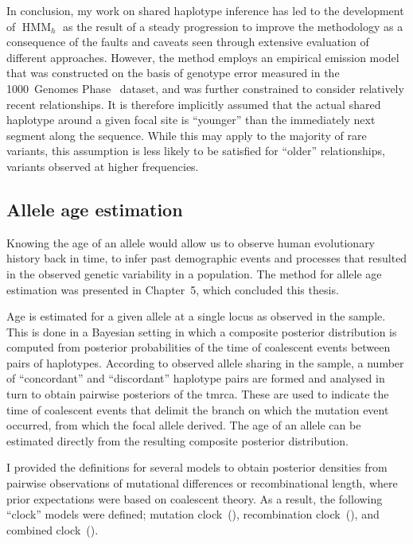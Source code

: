 In conclusion, my work on shared haplotype inference has led to the development of $\operatorname{HMM}_h$ as the result of a steady progression to improve the methodology as a consequence of the faults and caveats seen through extensive evaluation of different approaches.
However, the method employs an empirical emission model that was constructed on the basis of genotype error measured in the 1000~Genomes Phase~ dataset, and was further constrained to consider relatively recent relationships.
It is therefore implicitly assumed that the actual shared haplotype around a given focal site is ``younger'' than the immediately next segment along the sequence.
While this may apply to the majority of rare variants, this assumption is less likely to be satisfied for ``older'' relationships, \eg variants observed at higher frequencies.



\subsection{Allele age estimation}

Knowing the age of an allele would allow us to observe human evolutionary history back in time, to infer past demographic events and processes that resulted in the observed genetic variability in a population.
The method for allele age estimation was presented in Chapter~5, which concluded this thesis.

Age is estimated for a given allele at a single locus as observed in the sample.
This is done in a Bayesian setting in which a composite posterior distribution is computed from
posterior probabilities of the time of coalescent events between pairs of haplotypes.
According to observed allele sharing in the sample, a number of ``concordant'' and ``discordant'' haplotype pairs are formed and analysed in turn to obtain pairwise posteriors of the \gls{tmrca}.
These are used to indicate the time of coalescent events that delimit the branch on which the mutation event occurred, from which the focal allele derived.
The age of an allele can be estimated directly from the resulting composite posterior distribution.

I provided the definitions for several models to obtain posterior densities from pairwise observations of mutational differences or recombinational length, where prior expectations were based on coalescent theory.
As a result, the following ``clock'' models were defined; mutation clock~(\ClockM), recombination clock~(\ClockR), and combined clock~(\ClockC).

